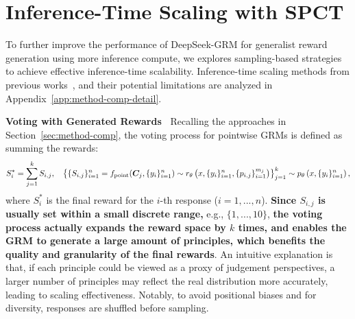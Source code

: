 \documentclass{article} %
\newcommand{\SGRMAll}{DeepSeek-GRM\xspace}
\begin{document}

\vspace{-0.5em}
\section{Inference-Time Scaling with SPCT}
\label{sec:inf-scaling}

To further improve the performance of \SGRMAll for generalist reward generation using more inference compute, we explores sampling-based strategies to achieve effective inference-time scalability. Inference-time scaling methods from previous works~\citep{wang2024selftaughtevaluators,ankner2024critiqueoutloudrewardmodels,mahan2024generativerewardmodels,zhang2025generative}, and their potential limitations are analyzed in Appendix~\ref{app:method-comp-detail}.

\noindent\textbf{Voting with Generated Rewards\ }
Recalling the approaches in Section~\ref{sec:method-comp}, the voting process for pointwise GRMs is defined as summing the rewards: 
\begin{equation}
\footnotesize
  S_i^* = \sum_{j=1}^k S_{i, j}, \quad \left\{\{S_{i, j}\}_{i=1}^n = f_{\mathrm{point}}(\boldsymbol{C}_j, \{y_i\}_{i=1}^n) \sim r_{\theta}\left(x, \{y_i\}_{i=1}^n, \{p_{i,j}\}_{i=1}^{m_j}\right) \right\}_{j=1}^k \sim p_{\theta}\left(x, \{y_i\}_{i=1}^n\right),
\end{equation}
where $S_i^*$ is the final reward for the $i$-th response ($i=1,...,n$). \textbf{Since $S_{i,j}$ is usually set within a small discrete range,} e.g., $\{1,...,10\}$, \textbf{the voting process actually expands the reward space by $k$ times, and enables the GRM to generate a large amount of principles, which benefits the quality and granularity of the final rewards}. An intuitive explanation is that, if each principle could be viewed as a proxy of judgement perspectives, a larger number of principles may reflect the real distribution more accurately, leading to scaling effectiveness. Notably, to avoid positional biases and for diversity, responses are shuffled before sampling. 
\end{document}
